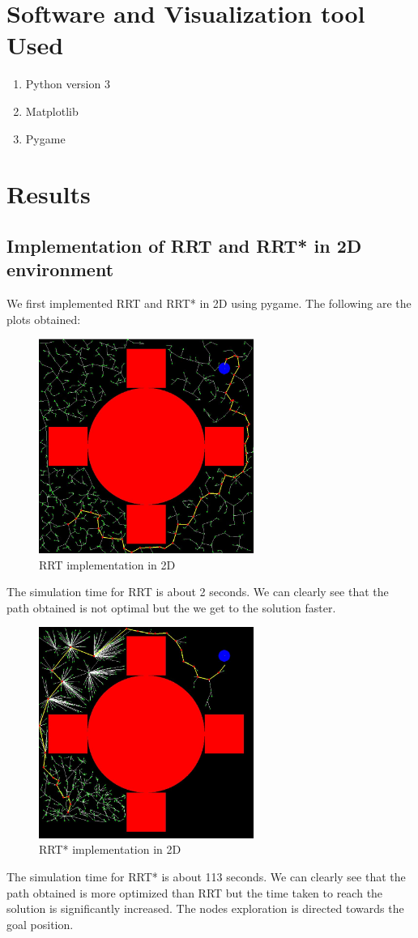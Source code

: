 \documentclass{IEEEtran}
\begin{document}
\section{\textbf{Software and Visualization tool Used}}
\begin{enumerate}
\item Python version 3
\item Matplotlib
\item Pygame
\end{enumerate}
\section{\textbf{Results}}
\subsection{\textbf{Implementation of RRT and RRT* in 2D environment}}
We first implemented RRT and RRT* in 2D using pygame. The following are the plots obtained:
\begin{figure}[h]
    \centering
    \includegraphics[width=7cm]{rrt2d}
    \caption{RRT implementation in 2D}
    \label{fig:RRT implementation in 2D}
\end{figure}
\newline 
The simulation time for RRT is about 2 seconds. We can clearly see that the path obtained is not optimal but the we get to the solution faster.
\newpage
\begin{figure}[h]
    \centering
    \includegraphics[width=7cm]{rrt2d1}
    \caption{RRT* implementation in 2D}
    \label{fig:RRT* implementation in 2D}
\end{figure} 
The simulation time for RRT* is about 113 seconds. We can clearly see that the path obtained is more optimized than RRT but the time taken to reach the solution is significantly increased. The nodes exploration is directed towards the goal position.
\end{document}
